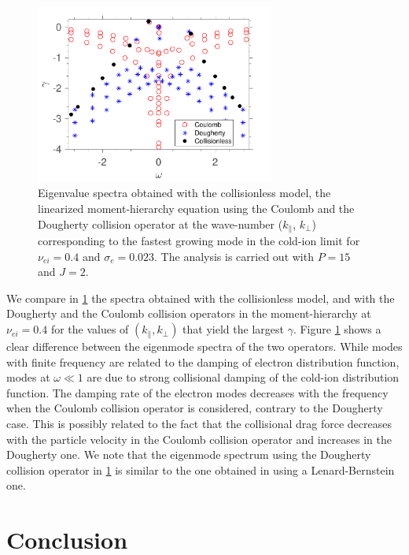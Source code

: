 
\begin{figure}
    \centering
    \includegraphics[width=0.7\textwidth]{images/DW_spectra.pdf}
    \caption{Eigenvalue spectra obtained with the collisionless model, the linearized moment-hierarchy equation using the Coulomb and the Dougherty collision operator {at the wave-number ($k_\parallel$, $k_\perp$) corresponding to the fastest growing mode in the cold-ion limit for $\nu_{ei}=0.4$ and $\sigma_e=0.023$}. The analysis is carried out with $P=15$ and $J=2$.}
    \label{fig:spectra}
\end{figure}

%
We compare in \cref{fig:spectra} the spectra obtained with the collisionless model, and with the Dougherty and the Coulomb collision operators in the moment-hierarchy at $\nu_{ei}=0.4$ for the values of $(k_\parallel, k_\perp)$ that yield the largest $\gamma$.
%
Figure \ref{fig:spectra} shows a clear difference between the eigenmode spectra of the two operators.
%
While modes with finite frequency are related to the damping of electron distribution function, modes at $\omega \ll 1$ are due to strong collisional damping of the cold-ion distribution function.
%
The damping rate of the electron modes decreases with the frequency when the Coulomb collision operator is considered, contrary to the Dougherty case. 
%
This is possibly related to the fact that the collisional drag force decreases with the particle velocity in the Coulomb collision operator and increases in the Dougherty one.
%
We note that the eigenmode spectrum using the Dougherty collision operator in \cref{fig:spectra} is similar to the one obtained in \citet{Bratanov2013} using a Lenard-Bernstein one.

\section{Conclusion}
\label{sec:dwconclusion}

